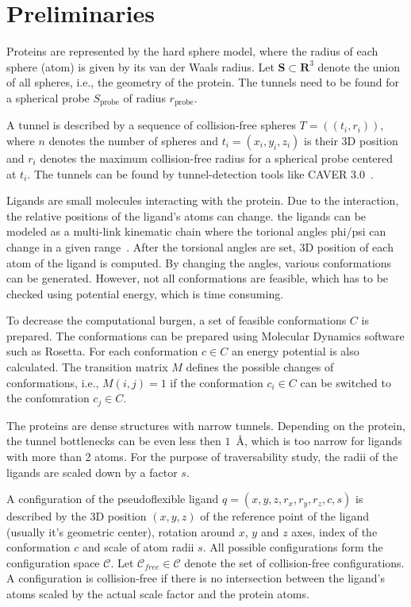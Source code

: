 \documentclass{svmult}
\def\C{\mathcal{C}}
\def\CF{\mathcal{C}_{free}}
\def\probe{r_{\mathrm{probe}}}
\def\Sprobe{S_{\mathrm{probe}}}
\def\SS{\mathbf{S}}
\begin{document}
\section{Preliminaries}

Proteins are represented by the hard sphere model, where the radius of each sphere (atom) is given by its van der Waals radius.
Let $\SS \subset \mathbf{R}^3$ denote the union of all spheres, i.e., the geometry of the protein.
The tunnels need to be found for a spherical probe $\Sprobe$ of radius $\probe$.

A tunnel is described by a sequence of collision-free spheres $T=( (t_i, r_i) )$, where $n$ denotes the number of spheres and
$t_i=(x_i,y_i,z_i)$ is their 3D position and $r_i$ denotes the maximum collision-free radius for a spherical probe centered
at $t_i$. 
The tunnels can be found by tunnel-detection tools like CAVER 3.0~\cite{caver3}.

Ligands are small molecules interacting with the protein. 
Due to the interaction, the relative positions of the ligand's atoms can change.
the ligands  can be modeled as a multi-link kinematic chain where the torional angles phi/psi can change in a given range~\cite{songPFpath}.
After the torsional angles are set, 3D position of each atom of the ligand is computed.
By changing the angles, various conformations can be generated.
However, not all conformations are feasible, which has to be checked using potential energy, which is time consuming.

To decrease the computational burgen, a set of feasible conformations $C$ is prepared.
The conformations can be prepared using Molecular Dynamics software such as Rosetta.
For each conformation $c\in C$ an energy potential is also calculated.
The transition matrix $M$ defines the possible changes of conformations, i.e., $M(i,j)=1$ if the conformation $c_i \in C$
can be switched to the confomration $c_j \in C$.

The proteins are dense structures with narrow tunnels.
Depending on the protein, the tunnel bottlenecks can be even less then $1$~\AA, which is too narrow for ligands with more than 2 atoms.
For the purpose of traversability study, the radii of the ligands are scaled down by a factor $s$.

A configuration of the pseudoflexible ligand $q=(x,y,z,r_x,r_y,r_z,c,s)$ is described
by the 3D position $(x,y,z)$ of the reference point of the ligand (usually it's geometric center), rotation around $x$, $y$ and $z$ axes,
index of the conformation $c$ and scale of atom radii $s$.
All possible configurations form the configuration space $\C$. 
Let $\CF \in \C$ denote the set of collision-free configurations. 
A configuration is collision-free if there is no intersection between the ligand's atoms scaled by the actual scale factor and the protein atoms.
\end{document}
